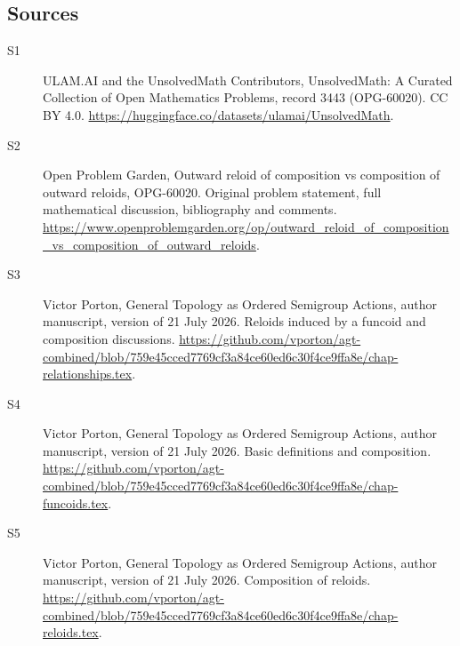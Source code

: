 \documentclass[11pt]{article}
\begin{document}
\subsection{Sources}
\begin{description}
\item[\hypertarget{source:3443:1}{S1}] ULAM.AI and the UnsolvedMath Contributors, UnsolvedMath: A Curated Collection of Open Mathematics Problems, record 3443 (OPG-60020). CC BY 4.0. \url{https://huggingface.co/datasets/ulamai/UnsolvedMath}.
\item[\hypertarget{source:3443:2}{S2}] Open Problem Garden, Outward reloid of composition vs composition of outward reloids, OPG-60020. Original problem statement, full mathematical discussion, bibliography and comments. \url{https://www.openproblemgarden.org/op/outward_reloid_of_composition_vs_composition_of_outward_reloids}.
\item[\hypertarget{source:3443:3}{S3}] Victor Porton, General Topology as Ordered Semigroup Actions, author manuscript, version of 21 July 2026. Reloids induced by a funcoid and composition discussions. \url{https://github.com/vporton/agt-combined/blob/759e45cced7769cf3a84ce60ed6c30f4ce9ffa8e/chap-relationships.tex}.
\item[\hypertarget{source:3443:4}{S4}] Victor Porton, General Topology as Ordered Semigroup Actions, author manuscript, version of 21 July 2026. Basic definitions and composition. \url{https://github.com/vporton/agt-combined/blob/759e45cced7769cf3a84ce60ed6c30f4ce9ffa8e/chap-funcoids.tex}.
\item[\hypertarget{source:3443:5}{S5}] Victor Porton, General Topology as Ordered Semigroup Actions, author manuscript, version of 21 July 2026. Composition of reloids. \url{https://github.com/vporton/agt-combined/blob/759e45cced7769cf3a84ce60ed6c30f4ce9ffa8e/chap-reloids.tex}.
\end{description}
\label{end:3443}
\end{document}
